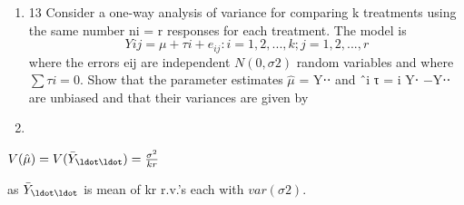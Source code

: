 \documentclass[a4paper,12pt]{article}
\begin{document}
\begin{enumerate}


\item 13 Consider a one-way analysis of variance for comparing k treatments using the
same number ni = r responses for each treatment. The model is
\[Yij = \mu + τi + e_{ij} : i = 1, 2, ..., k; j = 1,2, ..., r\]
where the errors eij are independent $N(0, \sigma 2)$ random variables and where $\sum τi = 0$.
Show that the parameter estimates $\hat{\mu}$ = Y⋅⋅ and ˆi τ = i Y⋅ −Y⋅⋅ are unbiased and
that their variances are given by

\newpge 
\item 


\end{enumerate}
\newpage


$V(\hat{\mu} ) = V(\bar{Y}_{\ldot \ldot} ) =

\frac{\sigma^2}{kr}$


as $\bar{Y}_{\ldot \ldot}$ is mean of kr r.v.’s each with $var(\sigma2)$.
\end{document}
